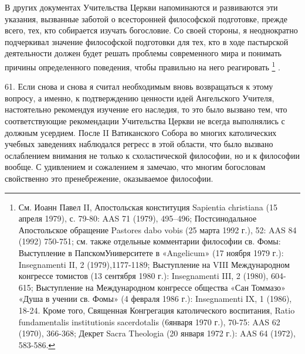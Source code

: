 \documentclass[a5paper,10pt]{article}
\begin{document}
В других документах Учительства Церкви напоминаются и развиваются эти указания,
вызванные заботой о всесторонней философской подготовке, прежде всего, тех, кто
собирается изучать богословие. Со своей стороны, я неоднократно подчеркивал
значение философской подготовки для тех, кто в ходе пастырской деятельности
должен будет решать проблемы современного мира и понимать причины определенного
поведения, чтобы правильно на него реагировать \footnote{См. Иоанн Павел II,
Апостольская конституция Sapientia christiana (15 апреля 1979), с. 79-80: AAS
71 (1979), 495–496; Постсинодальное Апостольское обращение Pastores dabo vobis
(25 марта 1992 г.), 52: AAS 84 (1992) 750-751; см. также отдельные комментарии
философии св. Фомы: Выступление в ПапскомУниверситете в «Angelicum» (17 ноября
1979 г.): Insegnamenti II, 2 (1979),1177-1189; Выступление на VIII
Международном конгрессе томистов (13 сентября 1980 г.): Insegnamenti III, 2
(1980), 604-615; Выступление на Международном конгрессе общества «Сан Томмазо»
«Душа в учении св. Фомы» (4 февраля 1986 г.): Insegnamenti IX, 1 (1986), 18-24.
Кроме того, Священная Конгрегация католического воспитания, Ratio fundamentalis
institutionis sacerdotalis (6января 1970 г.), 70-75: AAS 62 (1970), 366-368;
Декрет Sacra Theologia (20 января 1972 г.): AAS 64 (1972), 583-586.} .

61. Если снова и снова я считал необходимым вновь возвращаться к этому вопросу,
а именно, к подтверждению ценности идей Ангельского Учителя, настоятельно
рекомендуя изучение его наследия, то это было вызвано тем, что соответствующие
рекомендации Учительства Церкви не всегда выполнялись с должным усердием. После
II Ватиканского Собора во многих католических учебных заведениях наблюдался
регресс в этой области, что было вызвано ослаблением внимания не только к
схоластической философии, но и к философии вообще. С удивлением и сожалением я
замечаю, что многим богословам свойственно это пренебрежение, оказываемое
философии.
\end{document}
